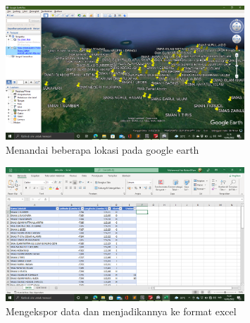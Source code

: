 \begin{enumerate}
\begin{figure}[h!]
  \centering
  \includegraphics[width=0.8\textwidth]{google earth.png}
  \caption{Menandai beberapa lokasi pada google earth}
\end{figure}

\begin{figure}[h!]
  \centering
  \includegraphics[width=0.8\textwidth]{ekspor excel.png}
  \caption{Mengekspor data dan menjadikannya ke format excel}
\end{figure}

\end{enumerate}

